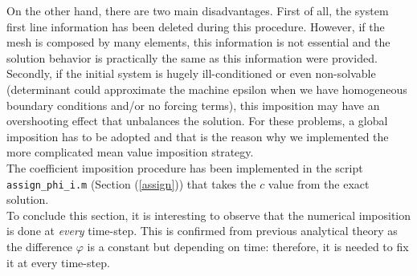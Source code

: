 \documentclass[a4paper,11pt]{article}
\begin{document}
\noindent On the other hand, there are two main disadvantages. First of all, the system first line information has been deleted during this procedure. However, if the mesh is composed by many elements, this information is not essential and the solution behavior is practically the same as this information were provided. \\
Secondly, if the initial system is hugely ill-conditioned or even non-solvable (determinant could approximate the machine epsilon when we have homogeneous boundary conditions and/or no forcing terms), this imposition may have an overshooting effect that unbalances the solution. For these problems, a global imposition has to be adopted and that is the reason why we implemented the more complicated mean value imposition strategy.\\

\noindent The coefficient imposition procedure has been implemented in the script \texttt{assign\_phi\_i.m} (Section (\ref{assign})) that takes the $c$ value from the exact solution.\\
\noindent To conclude this section, it is interesting to observe that the numerical imposition is done at \emph{every} time-step. This is confirmed from previous analytical theory as the difference $\varphi$ is a constant but depending on time: therefore, it is needed to fix it at every time-step.
\end{document}
